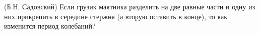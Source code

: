 (Б.Н. Садовский)
Если грузик маятника разделить на две равные части и одну из них прикрепить
в середине стержня (а вторую оставить в конце), то как изменится период
колебаний?
